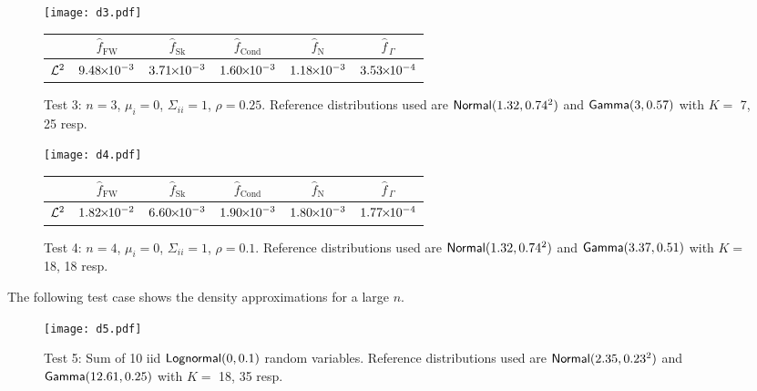 \begin{figure}[H]
\centering
\texttt{[image: d3.pdf]}

\vspace{4mm}

\begin{tabular}{c|c|c|c|c|c|}
\cline{2-6}
                         & $\widehat{f}_{\mathrm{FW}}$  & $\widehat{f}_{\mathrm{Sk}}$ & $\widehat{f}_{\mathrm{Cond}}$ & $\widehat{f}_{\mathrm{N}}$  & $\widehat{f}_{\,\Gamma}$ \\ \hline
\multicolumn{1}{|c|}{$\mathcal{L}^2$} & $9.48 {\mkern-2mu\times\mkern-2mu} 10^{-3}$ & $3.71 {\mkern-2mu\times\mkern-2mu} 10^{-3}$ & $1.60 {\mkern-2mu\times\mkern-2mu} 10^{-3}$ & $1.18 {\mkern-2mu\times\mkern-2mu} 10^{-3}$ & $3.53 {\mkern-2mu\times\mkern-2mu} 10^{-4}$ \\ \hline
\end{tabular}
\caption*{Test 3: $n=3$, $\mu_i = 0$, $\Sigma_{ii} = 1$, $\rho = 0.25$. Reference distributions used are $\mathsf{Normal}(1.32,0.74^2)$ and $\mathsf{Gamma}(3,0.57)$ with $K =$ 7, 25 resp.}
\end{figure}


\begin{figure}[H]
\centering
\texttt{[image: d4.pdf]}

\vspace{4mm}

\begin{tabular}{c|c|c|c|c|c|}
\cline{2-6}
                         & $\widehat{f}_{\mathrm{FW}}$  & $\widehat{f}_{\mathrm{Sk}}$ & $\widehat{f}_{\mathrm{Cond}}$ & $\widehat{f}_{\mathrm{N}}$  & $\widehat{f}_{\,\Gamma}$ \\ \hline
\multicolumn{1}{|c|}{$\mathcal{L}^2$} & $1.82 {\mkern-2mu\times\mkern-2mu} 10^{-2}$ & $6.60 {\mkern-2mu\times\mkern-2mu} 10^{-3}$ & $1.90 {\mkern-2mu\times\mkern-2mu} 10^{-3}$ & $1.80 {\mkern-2mu\times\mkern-2mu} 10^{-3}$ & $1.77 {\mkern-2mu\times\mkern-2mu} 10^{-4}$ \\ \hline
\end{tabular}
\caption*{Test 4: $n=4$, $\mu_i = 0$, $\Sigma_{ii}=1$, $\rho = 0.1$. Reference distributions used are $\mathsf{Normal}(1.32,0.74^2)$ and $\mathsf{Gamma}(3.37,0.51)$ with $K =$ 18, 18 resp.}
\end{figure}

The following test case shows the density approximations for a large $n$.

\begin{figure}[H]
\centering
\texttt{[image: d5.pdf]}
\caption*{Test 5: Sum of 10 iid $\mathsf{Lognormal}(0,0.1)$ random variables. Reference distributions used are $\mathsf{Normal}(2.35,0.23^2)$ and $\mathsf{Gamma}(12.61,0.25)$ with $K =$ 18, 35 resp.}
\end{figure}


